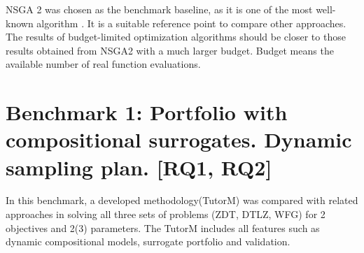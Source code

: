     NSGA 2 was chosen as the benchmark baseline, as it is one of the most well-known algorithm \cite{RamirezRV19}. It is a suitable reference point to compare other approaches. The results of budget-limited optimization algorithms should be closer to those results obtained from NSGA2 with a much larger budget. Budget means the available number of real function evaluations.

\section{Benchmark 1: Portfolio with compositional surrogates. Dynamic sampling plan. [RQ1, RQ2]}

    In this benchmark, a developed methodology(TutorM) was compared with related approaches in solving all three sets of problems (ZDT, DTLZ, WFG) for 2 objectives and 2(3) parameters. The TutorM includes all features such as dynamic compositional models, surrogate portfolio and validation.

